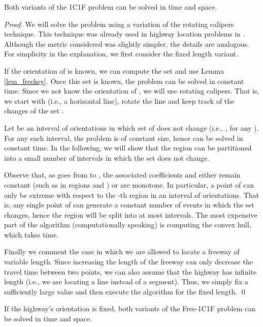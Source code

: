\documentclass{llncs}
\begin{document}
\begin{theorem}\label{theo_FL1C1F}
Both variants of the 1C1F problem can be solved in  time and  space.
\end{theorem}
\begin{proof}
We will solve the problem using a variation of the rotating calipers technique. This technique was already used in highway location problems in \cite{ahn09}. Although the metric considered was slightly simpler, the details are analogous. For simplicity in the explanation, we first consider the fixed length variant.

If the orientation of  is known, we can compute the set  and use Lemma \ref{lem_freekey}. Once this set is known, the problem can be solved in constant time. Since we not know the orientation of , we will use rotating calipers. That is, we start with  (i.e., a horizontal line), rotate the line and keep track of the changes of the set .

Let  be an interval of orientations in which set of  does not change (i.e., , for any ). For any such interval, the problem is of constant size, hence can be solved in constant time. In the following, we will show that the region  can be partitioned into a small number of intervals in which the set  does not change.

Observe that, as  goes from  to , the associated coefficients  and  either remain constant (such as in regions  and ) or are monotone. In particular, a point of  can only be extreme with respect to the -th region in an interval of orientations. That is, any single point of  can generate a constant number of events in which the set  changes, hence the region  will be split into at most  intervals. The most expensive part of the algorithm  (computationally speaking) is computing the convex hull, which takes  time.

Finally we comment the case in which we are allowed to locate a freeway of variable length. Since increasing the length of the freeway can only decrease the travel time between two points, we can also assume that the highway has infinite length (i.e., we are locating a line instead of a segment). Thus, we simply fix a sufficiently large value  and then execute the algorithm for the fixed length. \qed
\end{proof}



\begin{corollary}\label{cor_fixedor}
If the highway's orientation is fixed, both variants of the Free-1C1F problem can be solved in  time and  space.
\end{corollary}
\end{document}
